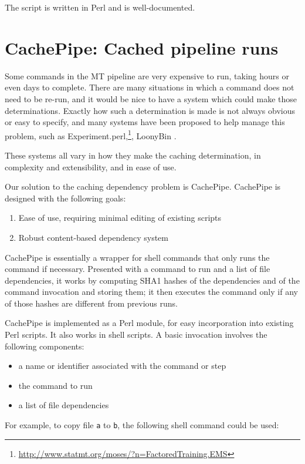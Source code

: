 \documentclass[11pt]{article}
\begin{document}
\noindent The script is written in Perl and is well-documented.

\section{CachePipe: Cached pipeline runs}

Some commands in the MT pipeline are very expensive to run, taking
hours or even days to complete.  There are many situations in which a
command does not need to be re-run, and it would be nice to have a
system which could make those determinations.  Exactly how such a
determination is made is not always obvious or easy to specify, and
many systems have been proposed to help manage this problem, such as
Experiment.perl,\footnote{\url{http://www.statmt.org/moses/?n=FactoredTraining.EMS}},
LoonyBin \cite{clark2010loonybin}.

These systems all vary in how they make the caching determination, in
complexity and extensibility, and in ease of use.  

Our solution to the caching dependency problem is CachePipe.
CachePipe is designed with the following goals:

\begin{enumerate}
\item Ease of use, requiring minimal editing of existing scripts
\item Robust content-based dependency system
\end{enumerate}

\noindent CachePipe is essentially a wrapper for shell commands that
only runs the command if necessary.  Presented with a command to run
and a list of file dependencies, it works by computing SHA1 hashes of
the dependencies and of the command invocation and storing them; it
then executes the command only if any of those hashes are different
from previous runs.  

CachePipe is implemented as a Perl module, for easy incorporation into
existing Perl scripts.  It also works in shell scripts.  A basic
invocation involves the following components:

\begin{itemize}
\item a name or identifier associated with the command or step
\item the command to run
\item a list of file dependencies
\end{itemize}

\noindent For example, to copy file \verb|a| to \verb|b|, the
following shell command could be used:
\end{document}

